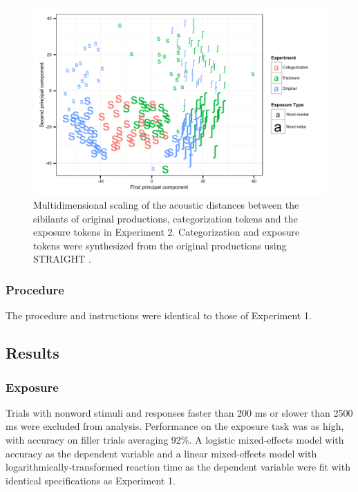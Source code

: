 \begin{figure}[ht]
\caption{Multidimensional scaling of the acoustic distances between the sibilants of original productions, categorization tokens and the exposure tokens in Experiment 2.  Categorization and exposure tokens were synthesized from the original productions using STRAIGHT \citep{Kawahara2008}.}
\label{fig:exp2mds}
\begin{center}
\includegraphics[width=\textwidth]{graphs/exp2_mds}
\end{center}
\end{figure}

\subsubsection{Procedure}

The procedure and instructions were identical to those of Experiment 1.

\subsection{Results}

\subsubsection{Exposure}

Trials with nonword stimuli and responses faster than 200 ms or slower than 2500 ms were excluded from analysis. 
Performance on the exposure task was as high, with accuracy on filler trials averaging 92\%.  
A logistic mixed-effects model with accuracy as the dependent variable and a linear mixed-effects model with logarithmically-transformed reaction time as the dependent variable were fit with identical specifications as Experiment 1.

